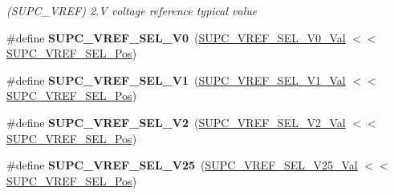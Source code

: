 \begin{DoxyCompactItemize}
\begin{DoxyCompactList}\small\item\em (S\+U\+P\+C\+\_\+\+V\+R\+E\+F) 2.\+V voltage reference typical value \end{DoxyCompactList}\item 
\hypertarget{group___s_a_m_l21___s_u_p_c_ga8db2aafbf9f44640e84d26c763e49d5a}{}\#define {\bfseries S\+U\+P\+C\+\_\+\+V\+R\+E\+F\+\_\+\+S\+E\+L\+\_\+V0}~(\hyperlink{group___s_a_m_l21___s_u_p_c_ga0d57396e9b9b3f7ecb97e25581e7a00c}{S\+U\+P\+C\+\_\+\+V\+R\+E\+F\+\_\+\+S\+E\+L\+\_\+V0\+\_\+\+Val}         $<$$<$ \hyperlink{group___s_a_m_l21___s_u_p_c_gad4360a3a50810b54b6e54cc7685f7cf5}{S\+U\+P\+C\+\_\+\+V\+R\+E\+F\+\_\+\+S\+E\+L\+\_\+\+Pos})\label{group___s_a_m_l21___s_u_p_c_ga8db2aafbf9f44640e84d26c763e49d5a}

\item 
\hypertarget{group___s_a_m_l21___s_u_p_c_ga93ce4387427569192d19bf2cfd81e6fc}{}\#define {\bfseries S\+U\+P\+C\+\_\+\+V\+R\+E\+F\+\_\+\+S\+E\+L\+\_\+V1}~(\hyperlink{group___s_a_m_l21___s_u_p_c_ga06478b9c3dd3f4382725fbb5c1642545}{S\+U\+P\+C\+\_\+\+V\+R\+E\+F\+\_\+\+S\+E\+L\+\_\+V1\+\_\+\+Val}         $<$$<$ \hyperlink{group___s_a_m_l21___s_u_p_c_gad4360a3a50810b54b6e54cc7685f7cf5}{S\+U\+P\+C\+\_\+\+V\+R\+E\+F\+\_\+\+S\+E\+L\+\_\+\+Pos})\label{group___s_a_m_l21___s_u_p_c_ga93ce4387427569192d19bf2cfd81e6fc}

\item 
\hypertarget{group___s_a_m_l21___s_u_p_c_ga4e84d49e30fb3fb7c561ba10cd7db141}{}\#define {\bfseries S\+U\+P\+C\+\_\+\+V\+R\+E\+F\+\_\+\+S\+E\+L\+\_\+V2}~(\hyperlink{group___s_a_m_l21___s_u_p_c_gaa85e43982e3779c28a68111dfc626364}{S\+U\+P\+C\+\_\+\+V\+R\+E\+F\+\_\+\+S\+E\+L\+\_\+V2\+\_\+\+Val}         $<$$<$ \hyperlink{group___s_a_m_l21___s_u_p_c_gad4360a3a50810b54b6e54cc7685f7cf5}{S\+U\+P\+C\+\_\+\+V\+R\+E\+F\+\_\+\+S\+E\+L\+\_\+\+Pos})\label{group___s_a_m_l21___s_u_p_c_ga4e84d49e30fb3fb7c561ba10cd7db141}

\item 
\hypertarget{group___s_a_m_l21___s_u_p_c_gaae6cf103ecc78ce8a13a8b212617f84b}{}\#define {\bfseries S\+U\+P\+C\+\_\+\+V\+R\+E\+F\+\_\+\+S\+E\+L\+\_\+V25}~(\hyperlink{group___s_a_m_l21___s_u_p_c_gad21e79e28bf7d79cfd9ee92ba389b6b4}{S\+U\+P\+C\+\_\+\+V\+R\+E\+F\+\_\+\+S\+E\+L\+\_\+V25\+\_\+\+Val}        $<$$<$ \hyperlink{group___s_a_m_l21___s_u_p_c_gad4360a3a50810b54b6e54cc7685f7cf5}{S\+U\+P\+C\+\_\+\+V\+R\+E\+F\+\_\+\+S\+E\+L\+\_\+\+Pos})\label{group___s_a_m_l21___s_u_p_c_gaae6cf103ecc78ce8a13a8b212617f84b}


\end{DoxyCompactItemize}
